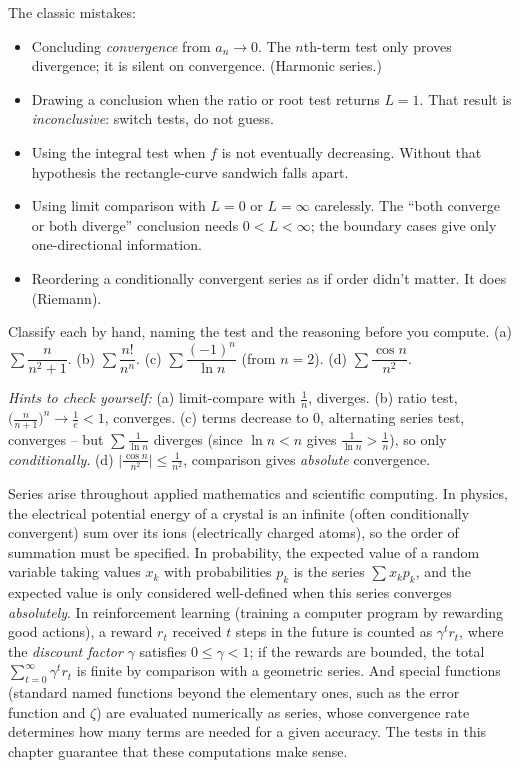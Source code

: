 \begin{trapbox}
The classic mistakes:
\begin{itemize}
\item Concluding \emph{convergence} from $a_n\to 0$. The $n$th-term test only proves divergence; it is silent on convergence. (Harmonic series.)
\item Drawing a conclusion when the ratio or root test returns $L=1$. That result is \emph{inconclusive}: switch tests, do not guess.
\item Using the integral test when $f$ is not eventually decreasing. Without that hypothesis the rectangle-curve sandwich falls apart.
\item Using limit comparison with $L=0$ or $L=\infty$ carelessly. The ``both converge or both diverge'' conclusion needs $0<L<\infty$; the boundary cases give only one-directional information.
\item Reordering a conditionally convergent series as if order didn't matter. It does (Riemann).
\end{itemize}
\end{trapbox}

\begin{labbox}
Classify each by hand, naming the test and the reasoning before you compute. (a) $\sum \dfrac{n}{n^2+1}$. \;(b) $\sum \dfrac{n!}{n^n}$. \;(c) $\sum \dfrac{(-1)^n}{\ln n}$ (from $n=2$). \;(d) $\sum \dfrac{\cos n}{n^2}$.

\emph{Hints to check yourself:} (a) limit-compare with $\tfrac1n$, diverges. (b) ratio test, $\big(\tfrac{n}{n+1}\big)^n \to \tfrac1e<1$, converges. (c) terms decrease to $0$, alternating series test, converges -- but $\sum\tfrac{1}{\ln n}$ diverges (since $\ln n < n$ gives $\tfrac{1}{\ln n} > \tfrac1n$), so only \emph{conditionally}. (d) $\big|\tfrac{\cos n}{n^2}\big|\le \tfrac{1}{n^2}$, comparison gives \emph{absolute} convergence.
\end{labbox}

\begin{applicationbox}
Series arise throughout applied mathematics and scientific computing. In physics, the electrical potential energy of a crystal is an infinite (often conditionally convergent) sum over its ions (electrically charged atoms), so the order of summation must be specified. In probability, the expected value of a random variable taking values $x_k$ with probabilities $p_k$ is the series $\sum x_k p_k$, and the expected value is only considered well-defined when this series converges \emph{absolutely}. In reinforcement learning (training a computer program by rewarding good actions), a reward $r_t$ received $t$ steps in the future is counted as $\gamma^t r_t$, where the \emph{discount factor} $\gamma$ satisfies $0 \le \gamma < 1$; if the rewards are bounded, the total $\sum_{t=0}^\infty \gamma^t r_t$ is finite by comparison with a geometric series. And special functions (standard named functions beyond the elementary ones, such as the error function and $\zeta$) are evaluated numerically as series, whose convergence rate determines how many terms are needed for a given accuracy. The tests in this chapter guarantee that these computations make sense.
\end{applicationbox}

